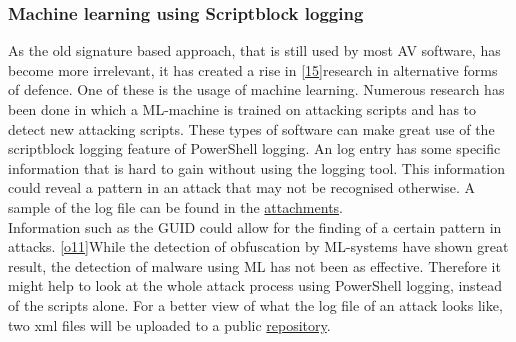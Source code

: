 \documentclass{article}%
\begin{document}
\subsubsection{Machine learning using Scriptblock logging}
As the old signature based approach, that is still used by most AV software, has become more irrelevant, it has created a rise in [\hyperlink{15}{15}]research in alternative forms of defence. One of these is the usage of machine learning. Numerous research has been done in which a ML-machine is trained on attacking scripts and has to detect new attacking scripts. These types of software can make great use of the scriptblock logging feature of PowerShell logging. An log entry has some specific information that is hard to gain without using the logging tool. This information could reveal a pattern in an attack that may not be recognised otherwise. A sample of the log file can be found in the \hyperlink{output2}{attachments}.\\
Information such as the GUID could allow for the finding of a certain pattern in attacks. [\hyperlink{o11}{o11}]While the detection of obfuscation by ML-systems have shown great result, the detection of malware using ML has not been as effective. Therefore it might help to look at the whole attack process using PowerShell logging, instead of the scripts alone. For a better view of what the log file of an attack looks like, two xml files will be uploaded to a public \href{https://github.com/ZamirAmiri/Obfuscation}{repository}.
\end{document}
